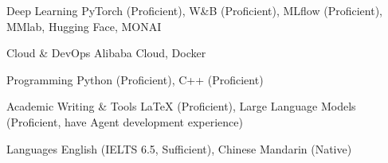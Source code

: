 

\begin{cvskills}

  \cvskill
  {Deep Learning}
  {PyTorch (Proficient), W\&B (Proficient), MLflow (Proficient), MMlab, Hugging Face, MONAI}

  \cvskill
  {Cloud \& DevOps}
  {Alibaba Cloud, Docker}

  \cvskill
  {Programming}
  {Python (Proficient), C++ (Proficient)}

  \cvskill
  {Academic Writing \& Tools}
  {LaTeX (Proficient), Large Language Models (Proficient, have Agent development experience)}

  \cvskill
  {Languages}
  {English (IELTS 6.5, Sufficient), Chinese Mandarin (Native)}

\end{cvskills}
